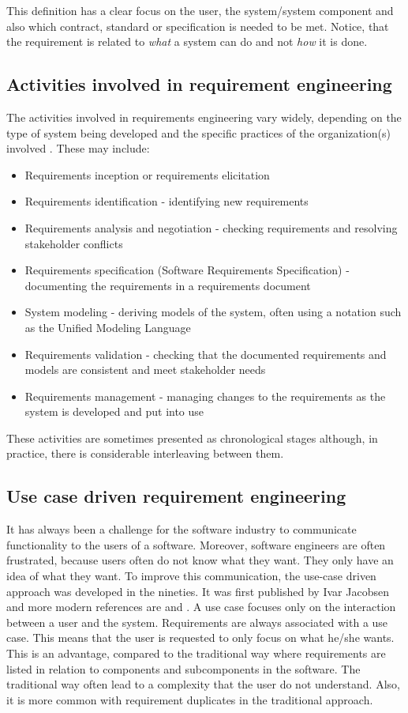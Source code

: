 \documentclass[11pt, oneside]{article}   	%
\begin{document}
This definition has a clear focus on the user, the system/system component and also which contract, standard or specification is needed to be met. Notice, that the requirement is related to \emph{what} a system can do and not \emph{how} it is done.

\subsection{Activities involved in requirement engineering}

The activities involved in requirements engineering vary widely, depending on the type of system being developed and the specific practices of the organization(s) involved  \cite{Som11}.  These may include:
\begin{itemize}
\item Requirements inception or requirements elicitation 
\item Requirements identification - identifying new requirements
\item Requirements analysis and negotiation - checking requirements and resolving stakeholder conflicts
\item Requirements specification (Software Requirements Specification) - documenting the requirements in a requirements document
\item System modeling - deriving models of the system, often using a notation such as the Unified Modeling Language
\item Requirements validation - checking that the documented requirements and models are consistent and meet stakeholder needs
\item Requirements management - managing changes to the requirements as the system is developed and put into use
\end{itemize}

These activities are sometimes presented as chronological stages although, in practice, there is considerable interleaving between them.  

\subsection{Use case driven requirement engineering}

It has always been a challenge for the software industry to communicate functionality to the users of a software. Moreover, software engineers are often frustrated, because users often do not know what they want. They only have an idea of what they want.  To improve this communication, the use-case driven approach was developed in the nineties.  It was first published by Ivar Jacobsen \cite{Jac92} and more modern references are \cite{Poh10} and \cite{Coc01}.  A use case focuses only on the interaction between a user and the system.  Requirements are always associated with a use case. This means that the user is requested to only focus on what he/she wants.  This is an advantage, compared to the traditional way where requirements are listed in relation to components and subcomponents in the software.  The traditional way often lead to a complexity that the user do not understand.  Also, it is more common with requirement duplicates in the traditional approach.
\end{document}
